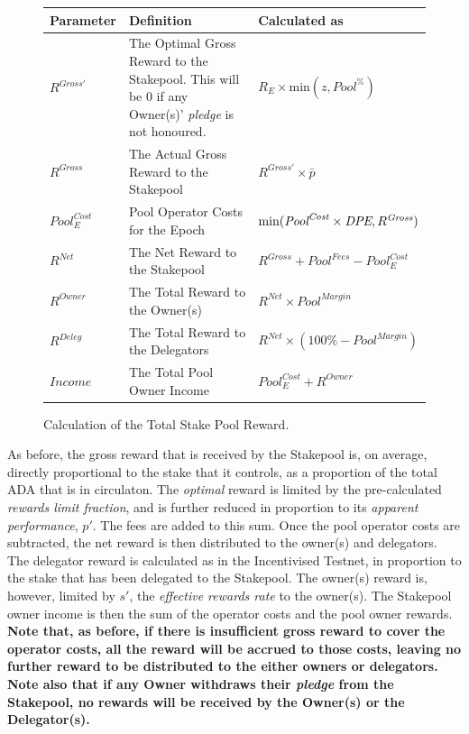 \documentclass[11pt,a4paper,dvipsnames,twosided,final]{article}
\newcommand{\ada}{ADA{}}
\begin{document}
\begin{figure}[h!]
\begin{center}
\begin{tabular}{||l|p{6cm}|l||}
  \hline \hline
\textbf{Parameter}  & \textbf{Definition} & \textbf{Calculated as} \\\hline
$R^{Gross'}$ & The Optimal Gross Reward to the Stakepool.  This will be 0 if any Owner(s)' \emph{pledge} is not honoured. & $R_E \times \textrm{min} (z,{\textit{Pool}}^\%)$ \\\hline
$R^{\textit{Gross}}$ & The Actual Gross Reward to the Stakepool & $R^{Gross'} \times \bar{p}$ \\\hline
${\textit{Pool}}^{\textit{Cost}}_E$ & Pool Operator Costs for the Epoch & $\textrm{min}(\textit{\textit{Pool}}^{\textit{Cost}} \times \textit{DPE},R^{\textit{Gross}})$ \\\hline
$R^{\textit{Net}}$  & The Net Reward to the Stakepool & $R^{\textit{Gross}}+{\textit{Pool}}^{\textit{Fees}} - {\textit{Pool}}^{\textit{Cost}}_E$ \\\hline
$R^{\textit{Owner}}$ & The Total Reward to the Owner(s) & $R^{\textit{Net}} \times {\textit{Pool}}^{\textit{Margin}} $ \\\hline
$R^{\textit{Deleg}}$ & The Total Reward to the Delegators & $R^{\textit{Net}} \times (100\% - {\textit{Pool}}^{\textit{Margin}})$ \\\hline
$\textit{Income}$ & The Total Pool Owner Income & ${\textit{Pool}}^{\textit{Cost}}_E + R^{Owner}$ \\\hline
\hline
\end{tabular}
\end{center}
\caption{Calculation of the Total Stake Pool Reward.}
\end{figure}

\noindent
As before, the gross reward that is received by the Stakepool is, on average, directly proportional to the
stake that it controls, as a proportion of the total \ada{} that is in circulaton.
The \emph{optimal} reward is limited by the pre-calculated \emph{rewards limit fraction}, and is further reduced in
proportion to its \emph{apparent performance}, $p'$.
The fees are added to this sum.
Once the pool operator costs are subtracted,
the net reward is then distributed to the owner(s) and delegators.
The delegator reward is calculated as in the Incentivised Testnet, in proportion to the stake that has
been delegated to the Stakepool.
The owner(s) reward is, however, limited by $s'$, the \emph{effective rewards rate} to the owner(s).
%
The Stakepool owner income is then the sum of the operator costs and the pool owner rewards.
\textbf{Note that, as before, if there is insufficient gross reward to cover the operator costs, all the reward will be accrued to those
costs, leaving no further reward to be distributed to the either owners or delegators.
Note also that if any Owner withdraws their \emph{pledge} from the Stakepool, no rewards will be received by the Owner(s) or the Delegator(s).}
\end{document}
